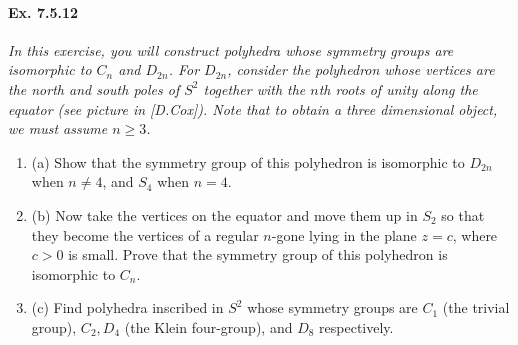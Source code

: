 \documentclass[11pt,a4paper]{article}
\newcommand{\be} {\begin{enumerate}}
\newcommand{\ee} {\end{enumerate}}
\begin{document}
\paragraph{Ex. 7.5.12}

{\it In this exercise, you will construct polyhedra whose symmetry groups are isomorphic to $C_n$ and $D_{2n}$. For $D_{2n}$, consider the polyhedron whose vertices are the north and south poles of $S^2$ together with the $n$th roots of unity along the equator (see picture in [D.Cox]). Note that to obtain a three dimensional object, we must assume $n\geq 3$.
\be
\item[(a)] Show that the symmetry group of this polyhedron is isomorphic to $D_{2n}$ when $n\neq 4$, and $S_4$ when $n = 4$.
\item[(b)] Now take the vertices on the equator and move them up in $S_2$ so that they become the vertices of a regular $n$-gone lying in the plane $z=c$, where $c>0$ is small. Prove that the symmetry group of this polyhedron is isomorphic to $C_n$.
\item[(c)] Find polyhedra inscribed in $S^2$ whose symmetry groups are $C_1$ (the trivial group), $C_2,D_4$ (the Klein four-group), and $D_8$ respectively.
\ee
}
\end{document}
